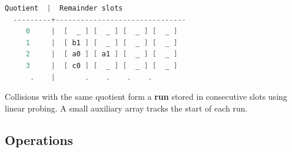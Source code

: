 \begin{lstlisting}[language=Java]
  Quotient  |  Remainder slots
  ---------+-------------------------------
     0     |  [  _ ] [  _ ] [  _ ] [  _ ]
     1     |  [ b1 ] [  _ ] [  _ ] [  _ ]
     2     |  [ a0 ] [ a1 ] [  _ ] [  _ ]
     3     |  [ c0 ] [  _ ] [  _ ] [  _ ]
      .    |       .    .    .    .
\end{lstlisting}

\noindent Collisions with the same quotient form a \textbf{run} stored in consecutive slots using linear probing. A small auxiliary array tracks the start of each run.

\subsection{Operations}

